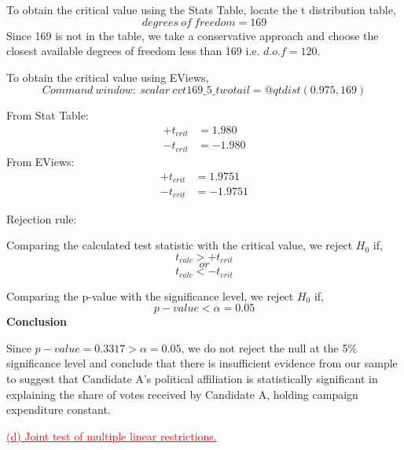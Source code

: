 \documentclass[12pt]{report}
\begin{document}
\noindent To obtain the critical value using the Stats Table, locate the t distribution table,
$$degrees\ of\ freedom = 169$$
\noindent Since 169 is not in the table, we take a conservative approach and choose the closest available degrees of freedom less than 169 i.e. $d.o.f=120$. 
\begin{figure}[H]
	\centering
\end{figure}
\vspace{-\baselineskip}
\noindent To obtain the critical value using EViews,
$$Command\ window:\ scalar\ cvt169\_5\_twotail=@qtdist(0.975,169)$$
\begin{figure}[H]
	\centering
\end{figure}
\vspace{-\baselineskip}
\begin{figure}[H]
	\centering
\end{figure}
\vspace{-\baselineskip}
\begin{figure}[H]
	\centering
\end{figure}
\vspace{-\baselineskip}
\noindent From Stat Table:
\begin{align*}
	+t_{crit} &= 1.980 \\
	-t_{crit} &= -1.980
\end{align*}
\noindent From EViews:
\begin{align*}
	+t_{crit} &= 1.9751 \\
	-t_{crit} &= -1.9751
\end{align*}

\noindent Rejection rule: 

\noindent Comparing the calculated test statistic with the critical value, we reject $H_0$ if,
$$t_{calc} > +t_{crit}$$
$$or$$
$$t_{calc} < -t_{crit}$$

\noindent Comparing the p-value with the significance level, we reject $H_0$ if,
$$p-value < \alpha = 0.05$$
\noindent \textbf{Conclusion}

\noindent Since $p-value = 0.3317 > \alpha = 0.05$, we do not reject the null at the 5\% significance level and conclude that there is insufficient evidence from our sample to suggest that Candidate A’s political affiliation is statistically significant in explaining the share of votes received by Candidate A, holding campaign expenditure constant.

\newpage
\noindent \textcolor{red}
{
	\uline{(d) Joint test of multiple linear restrictions.}
}
\end{document}
